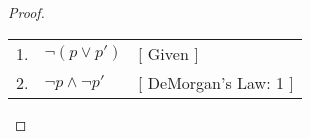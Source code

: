 \begin{proof} \hfill\par
    \begin{tabular}{rll}
        1. & \( \neg (p \lor p') \) & [ Given ] \\
        2. & \( \neg p \land \neg p' \) & [ DeMorgan's Law: 1 ] \\
    \end{tabular} \par
\end{proof}
